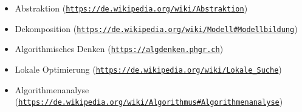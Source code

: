 \documentclass[a4paper,11pt]{report}
\newcommand{\BrochureUrlText}[1]{\texttt{#1}}
\begin{document}
\begin{itemize}
  \item Abstraktion (\href{https://de.wikipedia.org/wiki/Abstraktion}{\BrochureUrlText{https://de.wikipedia.org/wiki/Abstraktion}})
  \item Dekomposition (\href{https://de.wikipedia.org/wiki/Modell\#Modellbildung}{\BrochureUrlText{https://de.wikipedia.org/wiki/Modell\#Modellbildung}})
  \item Algorithmisches Denken (\href{https://algdenken.phgr.ch}{\BrochureUrlText{https://algdenken.phgr.ch}})
  \item Lokale Optimierung (\href{https://de.wikipedia.org/wiki/Lokale_Suche}{\BrochureUrlText{https://de.wikipedia.org/wiki/Lokale\_Suche}})
  \item Algorithmenanalyse (\href{https://de.wikipedia.org/wiki/Algorithmus\#Algorithmenanalyse}{\BrochureUrlText{https://de.wikipedia.org/wiki/Algorithmus\#Algorithmenanalyse}})
\end{itemize}
\end{document}
